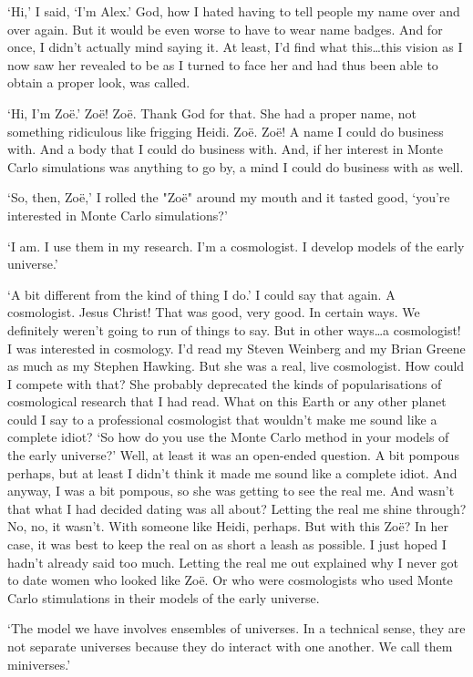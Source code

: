 `Hi,' I said, `I'm Alex.' God, how I hated having to tell people my
name over and over again. But it would be even worse to have to wear
name badges. And for once, I didn't actually mind saying it. At
least, I'd find what this\dots this {\twelveit vision\/} as I now
saw her revealed to be as I turned to face her and had thus been
able to obtain a proper look, was called.

`Hi, I'm Zo{\"e}.' Zo{\"e}! Zo{\"e}. Thank God for that. She had a
proper name, not something ridiculous like frigging Heidi. Zo{\"e}.
Zo{\"e}! A name I could do business with. And a body that I could do
business with. And, if her interest in Monte Carlo simulations was
anything to go by, a mind I could do business with as well.

`So, then, Zo{\"e},' I rolled the "Zo{\"e}" around my mouth and it
tasted good, `you're interested in Monte Carlo simulations?'

`I am. I use them in my research. I'm a cosmologist. I develop
models of the early universe.'

`A bit different from the kind of thing I do.' I could say that
again. A cosmologist. Jesus Christ! That was good, {\twelveit very}
good. In certain ways. We definitely weren't going to run of things
to say. But in other ways\dots a cosmologist! I was interested in
cosmology. I'd read my Steven Weinberg and my Brian Greene as much
as my Stephen Hawking. But she was a real, live cosmologist. How
could I compete with that? She probably deprecated the kinds of
popularisations of cosmological research that I had read. What on
this Earth or any other planet could I say to a professional
cosmologist that wouldn't make me sound like a complete idiot? `So
how do you use the Monte Carlo method in your models of the early
universe?' Well, at least it was an open-ended question. A bit
pompous perhaps, but at least I didn't {\twelveit think\/} it made
me sound like a complete idiot. And anyway, I was a bit pompous, so
she was getting to see the real me. And wasn't that what I had
decided dating was all about? Letting the real me shine through? No,
no, it wasn't. With someone like Heidi, perhaps. But with this Zo{\"e}?
In her case, it was best to keep the real on as short a leash as
possible. I just hoped I hadn't already said too much. Letting the
real me out explained why I never got to date women who looked like
Zo{\"e}. Or who were cosmologists who used Monte Carlo stimulations
in their models of the early universe.

`The model we have involves ensembles of universes. In a technical
sense, they are not separate universes because they do interact with
one another. We call them miniverses.'

